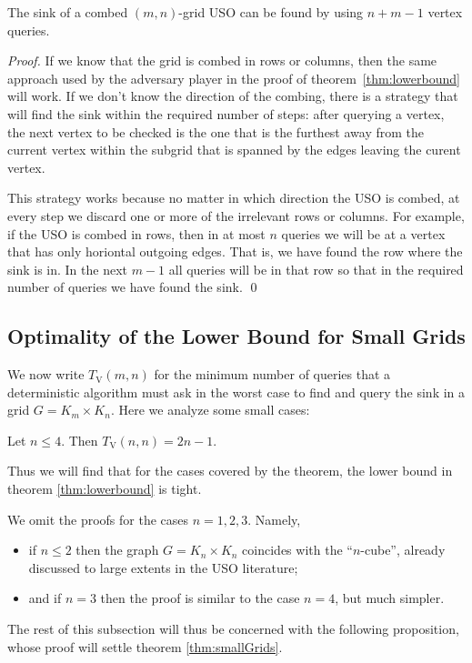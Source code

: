 \documentclass[runningheads,a4paper]{llncs}
\newcommand{\timeVertex}{\ensuremath{T_\mathrm{V}}}
\begin{document}
\begin{theorem}
 The sink of a combed $(m,n)$-grid USO can be found by using $n+m-1$ vertex queries.
\end{theorem}

\begin{proof}
 If we know that the grid is combed in rows or columns, then the same approach used by the adversary player in the proof of theorem~\ref{thm:lowerbound} will work.
 If we don't know the direction of the combing, there is a strategy that will find the sink within the required number of steps: after querying a vertex, the next vertex to be checked is the one that is the furthest away from the current vertex within the subgrid that is spanned by the edges leaving the curent vertex. 
 
 This strategy works because no matter in which direction the USO is combed, at every step we discard  one or more of the irrelevant rows or columns. For example, if the USO is combed in rows, then in at most $n$ queries we will be at a vertex that has only horiontal outgoing edges. That is, we have found the row where the sink is in. In the next $m-1$ all queries will be in that row so that in the required number of queries we have found the sink. \qed
\end{proof}


\subsection{Optimality of the Lower Bound for Small Grids}

We now write $\timeVertex(m,n)$ for the minimum number of queries that a
deterministic algorithm must ask in the worst case to find and query the sink
in a grid $G = K_m \times K_n$.
Here we analyze some small cases:
\begin{theorem}
    \label{thm:smallGrids}
    Let $n \le 4$. Then $\timeVertex(n,n) = 2n-1$.
\end{theorem}
Thus we will find that for the cases covered by the theorem, the lower bound
in theorem \ref{thm:lowerbound} is tight.

We omit the proofs for the cases $n = 1,2,3$. Namely,
\begin{itemize}
    \item
        if $n \le 2$ then the graph $G = K_n \times K_n$ coincides with the
        ``$n$-cube'', already discussed to large extents in the USO
        literature;
    \item
        and if $n = 3$ then the proof is similar to the case $n=4$, but much
        simpler.
\end{itemize}
The rest of this subsection will thus be concerned with the following
proposition, whose proof will settle theorem \ref{thm:smallGrids}.
\end{document}
